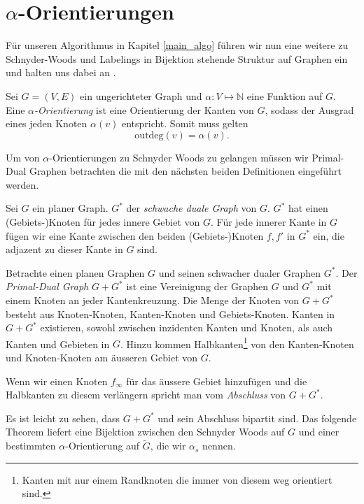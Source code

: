 \section{$\alpha$-Orientierungen}\label{alpha_orientations}

Für unseren Algorithmus in Kapitel \ref{main_algo} führen wir nun eine weitere zu Schnyder-Woods und Labelings in Bijektion stehende Struktur auf Graphen ein und halten uns dabei an \cite{felsner04}.

\begin{definition}
Sei $G=(V,E)$ ein ungerichteter Graph und $\alpha:V\mapsto\mathbb{N}$ eine Funktion auf $G$. Eine $\alpha$\textit{-Orientierung} ist eine Orientierung der Kanten von $G$, sodass der Ausgrad eines jeden Knoten $\alpha(v)$ entspricht. Somit muss gelten $$\text{outdeg}(v) = \alpha(v).$$
\end{definition}

Um von $\alpha$-Orientierungen zu Schnyder Woods zu gelangen müssen wir Primal-Dual Graphen betrachten die mit den nächsten beiden Definitionen eingeführt werden.

\begin{definition}
Sei $G$ ein planer Graph. $G^*$ der \textit{schwache duale Graph} von $G$. $G^*$ hat einen (Gebiets-)Knoten für jedes innere Gebiet von $G$. Für jede innerer Kante in $G$ fügen wir eine Kante zwischen den beiden (Gebiets-)Knoten $f,f'$ in $G^*$ ein, die adjazent zu dieser Kante in $G$ sind.
\end{definition}

\begin{definition}
Betrachte einen planen Graphen $G$ und seinen schwacher dualer Graphen $G^*$. Der \textit{Primal-Dual Graph} $G+G^*$ ist eine Vereinigung der Graphen $G$ und $G^*$ mit einem Knoten an jeder Kantenkreuzung. Die Menge der Knoten von $G+G^*$ besteht aus Knoten-Knoten, Kanten-Knoten und Gebiets-Knoten. Kanten in $G+G^*$ existieren, sowohl zwischen inzidenten Kanten und Knoten, als auch Kanten und Gebieten in $G$. Hinzu kommen Halbkanten\footnote{Kanten mit nur einem Randknoten die immer von diesem weg orientiert sind.} von den Kanten-Knoten und Knoten-Knoten am äusseren Gebiet von $G$.

Wenn wir einen Knoten $f_\infty$ für das äussere Gebiet hinzufügen und die Halbkanten zu diesem verlängern spricht man vom \textit{Abschluss} von $G+G^*$.

\end{definition}
Es ist leicht zu sehen, dass $G+G^*$ und sein Abschluss bipartit sind. Das folgende Theorem liefert eine Bijektion zwischen den Schnyder Woods auf $G$ und einer bestimmten $\alpha$-Orientierung auf $\tilde{G}$, die wir $\alpha_s$ nennen.

